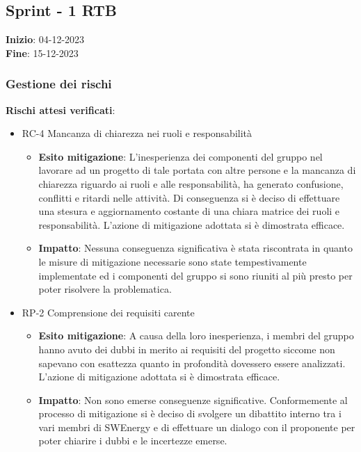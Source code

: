 \subsection{Sprint - 1 RTB}
\textbf{Inizio}: 04-12-2023 \\
\textbf{Fine}: 15-12-2023

\subsubsection{Gestione dei rischi}
\textbf{Rischi attesi verificati}:

\begin{itemize}
	\item RC-4 Mancanza di chiarezza nei ruoli e responsabilità
	\begin{itemize}
		\item \textbf{Esito mitigazione}: L'inesperienza dei componenti del gruppo nel lavorare ad un progetto di tale portata con altre persone 
		e la mancanza di chiarezza riguardo ai ruoli e alle responsabilità, ha generato confusione, conflitti e ritardi nelle attività. Di conseguenza 
		si è deciso di effettuare una stesura e aggiornamento costante di una chiara matrice dei ruoli e responsabilità. L'azione di mitigazione adottata si è dimostrata efficace.

		\item \textbf{Impatto}: Nessuna conseguenza significativa è stata riscontrata in quanto le misure di mitigazione necessarie sono state tempestivamente implementate
		ed i componenti del gruppo si sono riuniti al più presto per poter risolvere la problematica.

	\end{itemize}
	\item RP-2 Comprensione dei requisiti carente
	\begin{itemize}
		\item \textbf{Esito mitigazione}: A causa della loro inesperienza, i membri del gruppo hanno avuto dei dubbi in merito ai requisiti del progetto siccome 
	 	non sapevano con esattezza quanto in profondità dovessero essere analizzati. L'azione di mitigazione adottata si è dimostrata efficace.
		\item \textbf{Impatto}: Non sono emerse conseguenze significative. Conformemente al processo di mitigazione si è deciso di svolgere un dibattito interno tra i vari membri di SWEnergy
		e di effettuare un dialogo con il proponente per poter chiarire i dubbi e le incertezze emerse.
	\end{itemize}		
\end{itemize}  

